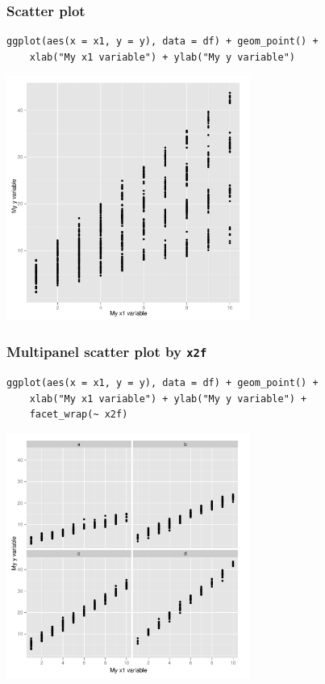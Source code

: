 \documentclass[bigger]{beamer}
\begin{document}
\begin{frame}[fragile]
\frametitle{Scatter plot}
\label{sec-3_5}

\lstset{language=R}
\begin{lstlisting}
ggplot(aes(x = x1, y = y), data = df) + geom_point() + 
    xlab("My x1 variable") + ylab("My y variable")
\end{lstlisting}



\includegraphics[width=0.6\textwidth]{../graphs/ggplot2_scatter.pdf}
\end{frame}
\begin{frame}[fragile]
\frametitle{Multipanel scatter plot by \texttt{x2f}}
\label{sec-3_6}

\lstset{language=R}
\begin{lstlisting}
ggplot(aes(x = x1, y = y), data = df) + geom_point() + 
    xlab("My x1 variable") + ylab("My y variable") +
    facet_wrap(~ x2f)
\end{lstlisting}



\includegraphics[width=0.6\textwidth]{../graphs/ggplot2_scatter_cond.pdf}
\end{frame}
\end{document}
